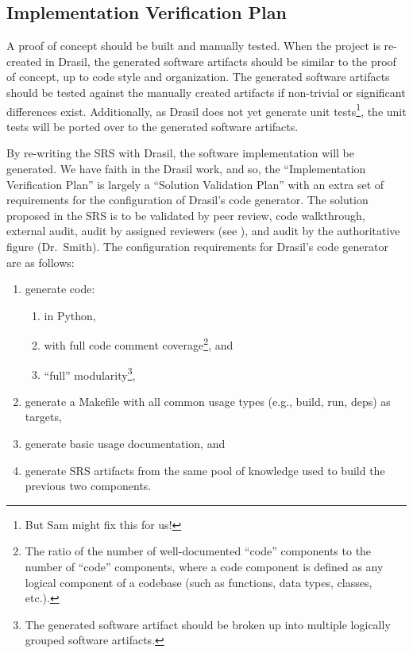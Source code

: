 \documentclass[12pt, titlepage]{article}
\begin{document}
\subsection{Implementation Verification Plan}

A proof of concept should be built and manually tested. When the project is
re-created in Drasil, the generated software artifacts should be similar to the
proof of concept, up to code style and organization. The generated software
artifacts should be tested against the manually created artifacts if non-trivial
or significant differences exist. Additionally, as Drasil does not yet generate
unit tests\footnote{But Sam might fix this for us!}, the unit tests will be
ported over to the generated software artifacts.

By re-writing the SRS with Drasil, the software implementation will be
generated. We have faith in the Drasil work, and so, the ``Implementation
Verification Plan'' is largely a ``Solution Validation Plan'' with an extra set
of requirements for the configuration of Drasil's code generator. The solution
proposed in the SRS is to be validated by peer review, code walkthrough,
external audit, audit by assigned reviewers (see ), and
audit by the authoritative figure (Dr.\ Smith). The configuration requirements
for Drasil's code generator are as follows:

\begin{enumerate}

    \item generate code:

          \begin{enumerate}

              \item in Python,

              \item with full code comment coverage\footnote{The ratio of the
                        number of well-documented ``code'' components to the
                        number of ``code'' components, where a code component is
                        defined as any logical component of a codebase (such as
                        functions, data types, classes, etc.).}, and

              \item ``full'' modularity\footnote{The generated software artifact
                        should be broken up into multiple logically grouped
                        software artifacts.},

          \end{enumerate}

    \item generate a Makefile with all common usage types (e.g., build, run,
          deps) as targets,

    \item generate basic usage documentation, and

    \item generate SRS artifacts from the same pool of knowledge used to build
          the previous two components.

\end{enumerate}
\end{document}
